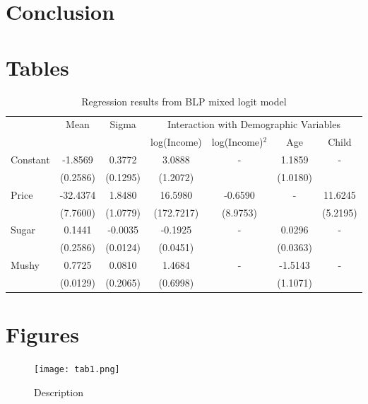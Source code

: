 \documentclass[11pt]{article}
\begin{document}
\section{Conclusion} \label{sec:Conclusion}

\newpage \printbibliography \label{sec:References}

\newpage \section*{Tables} \label{sec:tab}

\begin{table}[H]
    \centering
    \begin{tabular}{lcccccc}
        \hline
        & \multirow{2}{*}{Mean} & \multirow{2}{*}{Sigma} & \multicolumn{4}{c}{Interaction with Demographic Variables}\\
        \cline{4-7}
        & &  & log(Income) & log(Income)$^2$ & Age & Child \\
         \hline
         Constant & -1.8569 & 0.3772 & 3.0888 & - & 1.1859 & - \\
         & (0.2586) & (0.1295) & (1.2072) &  & (1.0180) &  \\ 
         Price & -32.4374 & 1.8480 & 16.5980 & -0.6590 & - & 11.6245 \\ 
         & (7.7600) & (1.0779) & (172.7217) & (8.9753) & & (5.2195) \\ 
         Sugar & 0.1441 & -0.0035 & -0.1925 & - & 0.0296 & -
         \\ 
         & (0.2586) & (0.0124) & (0.0451) & & (0.0363) & \\ 
         Mushy & 0.7725 & 0.0810 & 1.4684 & - & -1.5143 & - \\ 
         & (0.0129) & (0.2065) & (0.6998) & & (1.1071) & \\ 
          \hline
    \end{tabular}
    \caption{Regression results from BLP mixed logit model} 
    \label{blp-result}
\end{table}

\newpage \section*{Figures} \label{sec:fig}

\begin{figure}[H]
    \centering
    \texttt{[image: tab1.png]}
    \caption{Description}
    \label{fig:1}
\end{figure}
\end{document}
